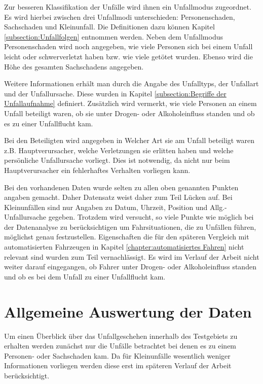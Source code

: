 Zur besseren Klassifikation der Unfälle wird ihnen ein Unfallmodus zugeordnet. Es wird hierbei zwischen drei Unfallmodi unterschieden: Personenschaden, Sachschaden und Kleinunfall. Die Definitionen dazu können Kapitel \ref{subsection:Unfallfolgen} entnommen werden. Neben dem Unfallmodus Personenschaden wird noch angegeben, wie viele Personen sich bei einem Unfall leicht oder schwerverletzt haben bzw. wie viele getötet wurden. Ebenso wird die Höhe des gesamten Sachschadens angegeben.

Weitere Informationen erhält man durch die Angabe des Unfalltyps, der Unfallart und der Unfallursache. Diese wurden in Kapitel \ref{subsection:Begriffe der Unfallaufnahme} definiert. Zusätzlich wird vermerkt, wie viele Personen an einem Unfall beteiligt waren, ob sie unter Drogen- oder Alkoholeinfluss standen und ob es zu einer Unfallflucht kam. 

Bei den Beteiligten wird angegeben in Welcher Art sie am Unfall beteiligt waren z.B. Hauptverursacher, welche Verletzungen sie erlitten haben und welche persönliche Unfallursache vorliegt. Dies ist notwendig, da nicht nur beim Hauptverursacher ein fehlerhaftes Verhalten vorliegen kann.

Bei den vorhandenen Daten wurde selten zu allen oben genannten Punkten angaben gemacht. Daher Datensatz weist daher zum Teil Lücken auf. Bei Kleinunfällen sind nur Angaben zu Datum, Uhrzeit, Position und Allg.-Unfallursache gegeben. Trotzdem wird versucht, so viele Punkte wie möglich bei der Datenanalyse zu berücksichtigen um Fahrsituationen, die zu Unfällen führen, möglichst genau festzustellen. Eigenschaften die für den späteren Vergleich mit automatisierten Fahrzeugen in  Kapitel \ref{chapter:automatisiertes Fahren} nicht relevant sind wurden zum Teil vernachlässigt. Es wird im Verlauf der Arbeit nicht weiter darauf eingegangen, ob Fahrer unter Drogen- oder Alkoholeinfluss standen und ob es bei dem Unfall zu einer Unfallflucht kam.

\section{Allgemeine Auswertung der Daten}
Um einen Überblick über das Unfallgeschehen innerhalb des Testgebiets zu erhalten werden zunächst nur die Unfälle betrachtet bei denen es zu einem Personen- oder Sachschaden kam. Da für Kleinunfälle wesentlich weniger Informationen vorliegen werden diese erst im späteren Verlauf der Arbeit berücksichtigt.

